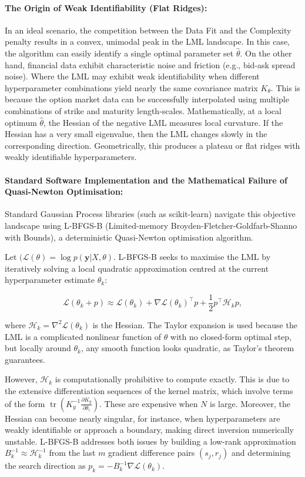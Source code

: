 \documentclass[12pt,oneside]{report}
\theoremstyle{definition}
\theoremstyle{remark}
\begin{document}
\paragraph{The Origin of Weak Identifiability (Flat Ridges):}
In an ideal scenario, the competition between the Data Fit and the Complexity penalty results in a convex, unimodal peak in the LML landscape. In this case, the algorithm can easily identify a single optimal parameter set $\hat{\theta}$. On the other hand, financial data exhibit characteristic noise and friction (e.g., bid-ask spread noise). Where the LML may exhibit weak identifiability when different hyperparameter combinations yield nearly the same covariance matrix $K_\theta$. This is because the option market data can be successfully interpolated using multiple combinations of strike and maturity length-scales. Mathematically, at a local optimum $\hat{\theta}$, the Hessian of the negative LML measures local curvature. If the Hessian has a very small eigenvalue, then the LML changes slowly in the corresponding direction. Geometrically, this produces a plateau or flat ridges with weakly identifiable hyperparameters.

\paragraph{Standard Software Implementation and the Mathematical Failure of Quasi-Newton Optimisation:} Standard Gaussian Process libraries (such as scikit-learn) navigate this objective landscape using L-BFGS-B (Limited-memory Broyden-Fletcher-Goldfarb-Shanno with Bounds), a deterministic Quasi-Newton optimisation algorithm. 

Let $(\mathcal{L}(\theta) = \log p(\mathbf{y} | X, \theta)$. L-BFGS-B seeks to maximise the LML by iteratively solving a local quadratic approximation centred at the current hyperparameter estimate $\theta_k$:

$$\mathcal{L}(\theta_k + p) \approx \mathcal{L}(\theta_k) + \nabla \mathcal{L}(\theta_k)^\top p + \frac{1}{2} p^\top \mathcal{H}_k p,$$

where $\mathcal{H}_k = \nabla^2 \mathcal{L}(\theta_k)$ is the Hessian. The Taylor expansion is used because the LML is a complicated nonlinear function of $\theta$ with no closed-form optimal step, but locally around $\theta_k$, any smooth function looks quadratic, as Taylor's theorem guarantees.

However, $\mathcal{H}_k$ is computationally prohibitive to compute exactly. This is due to the extensive differentiation sequences of the kernel matrix, which involve terms of the form $\operatorname{tr}\left(K_y^{-1} \frac{\partial K_y}{\partial \theta_i}\right)$. These are expensive when $N$ is large. Moreover, the Hessian can become nearly singular, for instance, when hyperparameters are weakly identifiable or approach a boundary, making direct inversion numerically unstable. L-BFGS-B addresses both issues by building a low-rank approximation $B_k^{-1} \approx \mathcal{H}_k^{-1}$ from the last $m$ gradient difference pairs $(s_j, r_j)$ and determining the search direction as $p_k = -B_k^{-1} \nabla \mathcal{L}(\theta_k)$.
\end{document}
